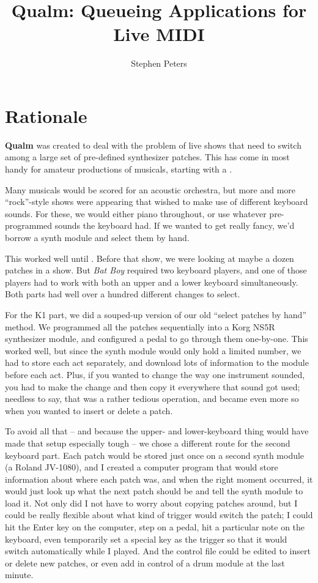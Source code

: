 \documentclass{article}
\newcommand{\q}{{\sf\bf{Qualm}}\xspace}
\begin{document}
\title{\q: Queueing Applications for Live MIDI}
\author{Stephen Peters}
\maketitle

\section{Rationale}

\q was created to deal with the problem of live shows that need to
switch among a large set of pre-defined synthesizer patches.  This has
come in most handy for amateur productions of musicals, starting with
a .

Many musicals would be scored for an acoustic orchestra, but more and
more ``rock''-style shows were appearing that wished to make use of
different keyboard sounds.  For these, we would either piano
throughout, or use whatever pre-programmed sounds the keyboard had.
If we wanted to get really fancy, we'd borrow a synth module and
select them by hand.

This worked well until .  Before
that show, we were looking at maybe a dozen patches in a show.  But
{\em Bat Boy} required two keyboard players, and one of those players
had to work with both an upper and a lower keyboard simultaneously.
Both parts had well over a hundred different changes to select.

For the K1 part, we did a souped-up version of our old ``select
patches by hand'' method.  We programmed all the patches sequentially
into a Korg NS5R synthesizer module, and configured a pedal to go
through them one-by-one.  This worked well, but since the synth module
would only hold a limited number, we had to store each act separately,
and download lots of information to the module before each act.  Plus,
if you wanted to change the way one instrument sounded, you had to
make the change and then copy it everywhere that sound got used;
needless to say, that was a rather tedious operation, and became even
more so when you wanted to insert or delete a patch.

To avoid all that -- and because the upper- and lower-keyboard thing
would have made that setup especially tough -- we chose a different
route for the second keyboard part.  Each patch would be stored just
once on a second synth module (a Roland JV-1080), and I created a
computer program that would store information about where each patch
was, and when the right moment occurred, it would just look up what
the next patch should be and tell the synth module to load it.  Not
only did I not have to worry about copying patches around, but I could
be really flexible about what kind of trigger would switch the patch;
I could hit the Enter key on the computer, step on a pedal, hit a
particular note on the keyboard, even temporarily set a special key as
the trigger so that it would switch automatically while I played.  And
the control file could be edited to insert or delete new patches, or
even add in control of a drum module at the last minute.
\end{document}
